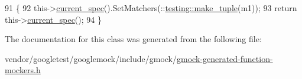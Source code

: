 \begin{DoxyCode}
91                                            \{
92     this->\hyperlink{classtesting_1_1internal_1_1FunctionMockerBase_a744318106e20b346f4f1efbf5a601644}{current\_spec}().SetMatchers(::\hyperlink{namespacestd_1_1tr1_af7e12a0f5b5791b5b7c49a5a17b85359}{testing::make\_tuple}(m1));
93     \textcolor{keywordflow}{return} this->\hyperlink{classtesting_1_1internal_1_1FunctionMockerBase_a744318106e20b346f4f1efbf5a601644}{current\_spec}();
94   \}
\end{DoxyCode}


The documentation for this class was generated from the following file\+:\begin{DoxyCompactItemize}
\item 
vendor/googletest/googlemock/include/gmock/\hyperlink{gmock-generated-function-mockers_8h}{gmock-\/generated-\/function-\/mockers.\+h}\end{DoxyCompactItemize}
